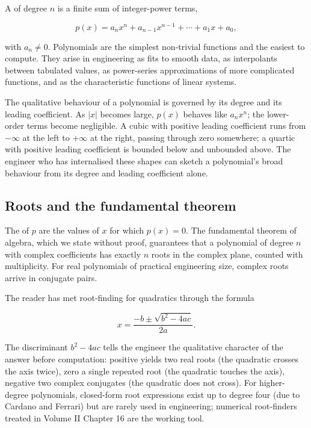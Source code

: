 A  of degree $n$ is a finite sum of integer-power
terms,

\[
p(x) = a_{n} x^{n} + a_{n-1} x^{n-1} + \cdots + a_{1} x + a_{0},
\]

with $a_{n} \neq 0$. Polynomials are the simplest non-trivial
functions and the easiest to compute. They arise in engineering as
fits to smooth data, as interpolants between tabulated values, as
power-series approximations of more complicated functions, and as the
characteristic functions of linear systems.

The qualitative behaviour of a polynomial is governed by its degree
and its leading coefficient. As $|x|$ becomes large, $p(x)$ behaves
like $a_{n} x^{n}$; the lower-order terms become negligible. A cubic
with positive leading coefficient runs from $-\infty$ at the left to
$+\infty$ at the right, passing through zero somewhere; a quartic
with positive leading coefficient is bounded below and unbounded
above. The engineer who has internalised these shapes can sketch a
polynomial's broad behaviour from its degree and leading coefficient
alone.

\subsection{Roots and the fundamental theorem}

The  of $p$ are the values of $x$ for which $p(x) = 0$.
The fundamental theorem of algebra, which we state without proof,
guarantees that a polynomial of degree $n$ with complex coefficients
has exactly $n$ roots in the complex plane, counted with multiplicity.
For real polynomials of practical engineering size, complex roots
arrive in conjugate pairs.

The reader has met root-finding for quadratics through the formula

\[
x = \frac{-b \pm \sqrt{b^{2} - 4ac}}{2a}.
\]

The discriminant $b^{2} - 4ac$ tells the engineer the qualitative
character of the answer before computation: positive yields two real
roots (the quadratic crosses the axis twice), zero a single repeated
root (the quadratic touches the axis), negative two complex
conjugates (the quadratic does not cross). For higher-degree
polynomials, closed-form root expressions exist up to degree four
(due to Cardano and Ferrari) but are rarely used in engineering;
numerical root-finders treated in Volume II Chapter 16 are the
working tool.

